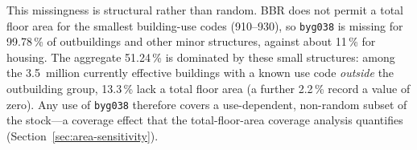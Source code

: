 This missingness is structural rather than random. BBR does not permit a
total floor area for the smallest building-use codes (910--930), so
\texttt{byg038} is missing for 99.78\,\% of outbuildings and other minor
structures, against about 11\,\% for housing. The aggregate 51.24\,\% is
dominated by these small structures: among the 3.5~million currently
effective buildings with a known use code \emph{outside} the outbuilding
group, 13.3\,\% lack a total floor area (a further 2.2\,\% record a
value of zero). Any use of \texttt{byg038} therefore covers a
use-dependent, non-random subset of the stock---a coverage effect that
the total-floor-area coverage analysis quantifies
(Section~\ref{sec:area-sensitivity}).
